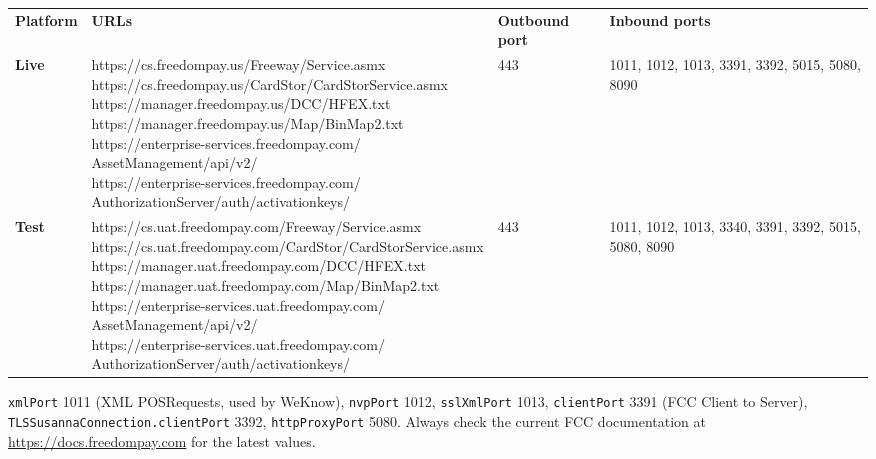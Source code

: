 \documentclass[a4paper,10pt]{article}
\begin{document}
\begin{center}
\renewcommand{\arraystretch}{1.3}\small
\begin{tabularx}{\textwidth}{L{18mm} X L{20mm} L{24mm}}
\color{white}\textbf{Platform} &
\color{white}\textbf{URLs} &
\color{white}\textbf{Outbound port} &
\color{white}\textbf{Inbound ports}\\
\textbf{Live} &
{\scriptsize\ttfamily
https://cs.freedompay.us/Freeway/Service.asmx\newline
https://cs.freedompay.us/CardStor/CardStorService.asmx\newline
https://manager.freedompay.us/DCC/HFEX.txt\newline
https://manager.freedompay.us/Map/BinMap2.txt\newline
https://enterprise-services.freedompay.com/\newline
\hspace*{3mm}AssetManagement/api/v2/\newline
https://enterprise-services.freedompay.com/\newline
\hspace*{3mm}AuthorizationServer/auth/activationkeys/}
& 443 & 1011, 1012, 1013, 3391, 3392, 5015, 5080, 8090\\
\textbf{Test} &
{\scriptsize\ttfamily
https://cs.uat.freedompay.com/Freeway/Service.asmx\newline
https://cs.uat.freedompay.com/CardStor/CardStorService.asmx\newline
https://manager.uat.freedompay.com/DCC/HFEX.txt\newline
https://manager.uat.freedompay.com/Map/BinMap2.txt\newline
https://enterprise-services.uat.freedompay.com/\newline
\hspace*{3mm}AssetManagement/api/v2/\newline
https://enterprise-services.uat.freedompay.com/\newline
\hspace*{3mm}AuthorizationServer/auth/activationkeys/}
& 443 & 1011, 1012, 1013, 3340, 3391, 3392, 5015, 5080, 8090\\
\end{tabularx}
\end{center}

\begin{wkwarn}
\texttt{xmlPort} 1011 (XML POSRequests, used by WeKnow),
\texttt{nvpPort} 1012, \texttt{sslXmlPort} 1013,
\texttt{clientPort} 3391 (FCC Client to Server),
\texttt{TLSSusannaConnection.clientPort} 3392,
\texttt{httpProxyPort} 5080. Always check the current FCC documentation
at \url{https://docs.freedompay.com} for the latest values.
\end{wkwarn}
\end{document}
